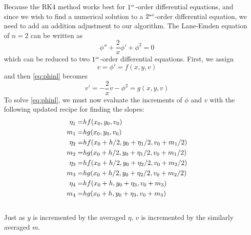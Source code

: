 \documentclass[12pt, manuscript]{article}
\begin{document}
    Because the RK4 method works best for $1^{\text{\tiny{st}}}$-order differential equations, and since we wish to find a numerical solution to a $2^{\text{\tiny{nd}}}$-order differential equation, we need to add an addition adjustment to our algorithm. The Lane-Emden equation of $n = 2$ can be written as 
    \begin{equation}\label{eq:phinl}
        \phi'' + \frac{2}{x}\phi' + \phi^2 = 0
    \end{equation} 
    which can be reduced to two $1^{\text{\tiny{st}}}$-order differential equations.  First, we assign 
        \begin{equation}
            v = \phi' = f(x, y, v)
        \end{equation}
        and then \eqref{eq:phinl} becomes
        \begin{equation}
            v' = - \frac{2}{x}v - \phi^2 = g(x, y, v)
        \end{equation}
        To solve \eqref{eq:phinl}, we must now evaluate the increments of $\phi$ and $v$ with the following updated recipe \cite{lea} for finding the slopes:
        \begin{align}
            \eta_1 =& hf(x_0, y_0, v_0) \notag \\ 
            m_1 =& hg(x_0, y_0, v_0)\notag \\ 
            \eta_2 =& hf(x_0 + h/2, y_0 + \eta_1/2, v_0 + m_1/2)\notag \\
            m_2 =& hg(x_0+h/2, y_0 + \eta_1/2, v_0 + m_1/2) \notag\\
            \eta_3 =& hf(x_0 + h/2, y_0 + \eta_2/2, v_0 + m_2/2) \label{eq:algor}\\
            m_3 =& hg(x_0+h/2, y_0 + \eta_2/2, v_0 + m_2/2) \notag \\
            \eta_4 =& hf(x_0 + h, y_0 + \eta_3, v_0 + m_3) \notag\\
            m_4 =& hg(x_0+h, y_0 + \eta_3, v_0 + m_3)\notag\\ \notag
        \end{align}
        Just as $y$ is incremented by the averaged $\eta$, $v$ is incremented by the similarly averaged $m$.
\end{document}
